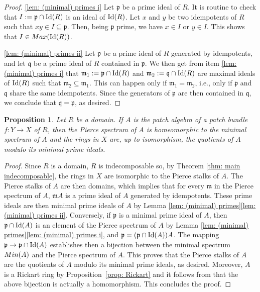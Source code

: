 \documentclass[11pt]{amsart}
\def\m{{\mathfrak m}} %
\newtheorem{proposition}[theorem]{Proposition}
\theoremstyle{definition}
\def\Id{\mbox{\rm Id}}
\begin{document}
\begin{proof}
    \ref{lem: (minimal) primes i} Let $\mathfrak p$ be a prime ideal of $R$. It is routine to check that $I:= \mathfrak p \cap \Id(R)$ is an ideal of $\Id(R)$. Let $x$ and $y$ be two idempotents of $R$ such that $xy\in I\subseteq \mathfrak p$. Then, being $\mathfrak p$ prime, we have $x\in I$ or $y\in I$. This shows that $I\in {\rm Max}(\Id (R))$.

    \ref{lem: (minimal) primes ii} Let $\mathfrak p$ be a prime ideal of $R$ generated by idempotents, and let $\mathfrak q$ be a prime ideal of $R$ contained in $\mathfrak p$. We then get from item \ref{lem: (minimal) primes i} that $\m_1:=\mathfrak p \cap \Id(R)$ and $\m_2:=\mathfrak q \cap \Id(R)$ are maximal ideals of $\Id(R)$ such that $\m_2\subseteq \m_1$. This can happen only if $\m_1=\m_2$, i.e., only if $\mathfrak p$ and $\mathfrak q$ share the same idempotents. Since the generators of $\mathfrak p$ are then contained in $\mathfrak q$, we conclude that $\mathfrak q=\mathfrak p$, as desired.
\end{proof}


 \begin{proposition} \label{prop: main domain}
Let $R$ be a domain. If $A$ is the patch algebra of a patch bundle  $f:Y \rightarrow X$ of $R$, then the Pierce spectrum of $A$ is homeomorphic to the minimal spectrum of $A$ and the rings in $X$ are, up to isomorphism, the quotients of $A$ modulo its minimal prime ideals. 
\end{proposition}

\begin{proof}
Since $R$ is a domain, $R$ is indecomposable so, by Theorem \ref{thm: main indecomposable}, the rings in $X$ are isomorphic to the Pierce stalks of $A$. The Pierce stalks of $A$ are then domains, which implies that for every $\m$ in the Pierce spectrum of $A$, $\m A$ is a prime ideal of $A$ generated by idempotents. These prime ideals are then minimal prime ideals of $A$ by Lemma \ref{lem: (minimal) primes}\ref{lem: (minimal) primes ii}. Conversely, if $\mathfrak p$ is a minimal prime ideal of $A$, then $\mathfrak p \cap \Id(A)$ is an element of the Pierce spectrum of $A$ by Lemma \ref{lem: (minimal) primes}\ref{lem: (minimal) primes i}, and $\mathfrak p = (\mathfrak p \cap \Id(A)) A$. The mapping $\mathfrak p \rightarrow \mathfrak p \cap \Id(A)$ establishes then a bijection between the minimal spectrum ${\rm Min}(A)$ and the Pierce spectrum of $A$. This proves that the Pierce stalks of $A$ are the quotients of $A$ modulo its minimal prime ideals, as desired. Moreover, $A$ is a Rickart ring by Proposition~\ref{prop: Rickart} and it follows from \cite[Theorem~1]{Kist} that the above bijection is actually a homomorphism. This concludes the proof.
\end{proof}
\end{document}
